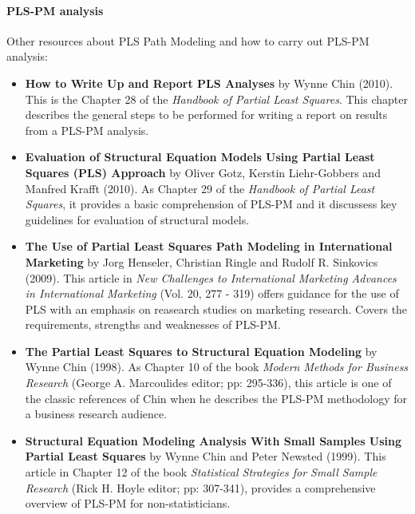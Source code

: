 \documentclass[12pt]{book}\usepackage{graphicx, color}
\begin{document}
\paragraph{PLS-PM analysis}
Other resources about PLS Path Modeling and how to carry out PLS-PM analysis:
\begin{itemize}
 \vspace{2mm}
 \item \textbf{\textsf{How to Write Up and Report PLS Analyses}} by Wynne Chin (2010). This is the Chapter 28 of the \textit{Handbook of Partial Least Squares}. This chapter describes the general steps to be performed for writing a report on results from a PLS-PM analysis.

 \vspace{2mm}
 \item \textbf{\textsf{Evaluation of Structural Equation Models Using Partial Least Squares (PLS) Approach}} by Oliver Gotz, Kerstin Liehr-Gobbers and Manfred Krafft (2010). As Chapter 29 of the \textit{Handbook of Partial Least Squares}, it provides a basic comprehension of PLS-PM and it discussess key guidelines for evaluation of structural models.

 \vspace{2mm}
 \item \textbf{\textsf{The Use of Partial Least Squares Path Modeling in International Marketing}} by Jorg Henseler, Christian Ringle and Rudolf R. Sinkovics (2009). This article in \textit{New Challenges to International Marketing Advances in International Marketing} (Vol. 20, 277 - 319) offers guidance for the use of PLS with an emphasis on reasearch studies on marketing research. Covers the requirements, strengths and weaknesses of PLS-PM.

 \vspace{2mm}
 \item \textbf{\textsf{The Partial Least Squares to Structural Equation Modeling}} by Wynne Chin (1998). As Chapter 10 of the book \textit{Modern Methods for Business Research} (George A. Marcoulides editor; pp: 295-336), this article is one of the classic references of Chin when he describes the PLS-PM methodology for a business research audience. 

\vspace{2mm}
 \item \textbf{\textsf{Structural Equation Modeling Analysis With Small Samples Using Partial Least Squares}} by Wynne Chin and Peter Newsted (1999). This article in Chapter 12 of the book \textit{Statistical Strategies for Small Sample Research} (Rick H. Hoyle editor; pp: 307-341), provides a comprehensive overview of PLS-PM for non-statisticians.


\end{itemize}
\end{document}
